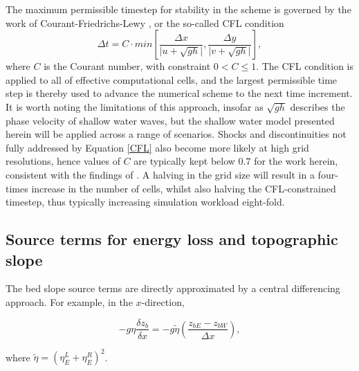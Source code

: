 The maximum permissible timestep for stability in the scheme is governed by the work of Courant-Friedrichs-Lewy \citep{Courant1967}, or the so-called CFL condition
\begin{equation}
	\label{CFL}
	\Delta t = C \cdot min \left[\frac{\Delta x}{\lvert u + \sqrt{gh} \rvert} , \frac{\Delta y}{\lvert v + \sqrt{gh} \rvert}\right] ,
\end{equation}
where \(C\) is the Courant number, with constraint \(0 < C \le 1\). The CFL condition is applied to all of effective computational cells, and the largest permissible time step is thereby used to advance the numerical scheme to the next time increment. It is worth noting the limitations of this approach, insofar as $\sqrt{gh}$ describes the phase velocity of shallow water waves, but the shallow water model presented herein will be applied across a range of scenarios. Shocks and discontinuities not fully addressed by Equation \ref{CFL} also become more likely at high grid resolutions, hence values of $C$ are typically kept below $0.7$ for the work herein, consistent with the findings of \citep{Erduran2002}. A halving in the grid size will result in a four-times increase in the number of cells, whilst also halving the CFL-constrained timestep, thus typically increasing simulation workload eight-fold.

\subsection{Source terms for energy loss and topographic slope}
\label{sec:source-terms}

The bed slope source terms are directly approximated by a central differencing approach. For example, in the $x$-direction,

\begin{equation}
	\label{SWE_1stO_BedSlope}
	-g \eta \frac{ \delta z_b }{ \delta x } = -g \tilde{\eta} \left ( \frac{ z_{bE} - z_{bW} }{ \Delta x } \right )
	,
\end{equation}

where $ \tilde{\eta} = ( \eta_{E}^{L} + \eta_{E}^{R} )^2 $. 

